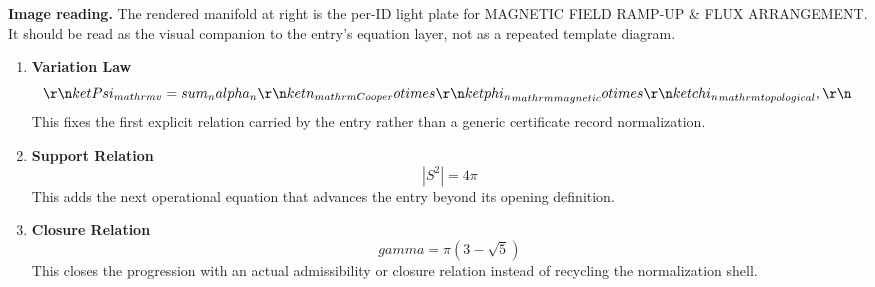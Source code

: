 \begin{samepage}
\noindent\begin{minipage}[t]{0.45\linewidth}
\vspace{0pt}
\raggedright
\scriptsize\textbf{Image reading.} The rendered manifold at right is the per-ID light plate for MAGNETIC FIELD RAMP-UP \& FLUX ARRANGEMENT. It should be read as the visual companion to the entry's equation layer, not as a repeated template diagram.\par
\end{minipage}\hfill
\begin{minipage}[t]{0.53\linewidth}
\vspace*{-0.10in}
\raggedright
{}
\end{minipage}
\end{samepage}

\clearpage


\begin{enumerate}[leftmargin=1.6em,itemsep=9pt,topsep=6pt]
\item \textbf{Variation Law}
\[
\r\n\\ket{\\Psi_{\\mathrm{v}}} = \\sum_{n} \\alpha_n \r\n\\ket{n}_{\\mathrm{Cooper}} \\otimes \r\n\\ket{\\phi_n}_{\\mathrm{magnetic}} \\otimes \r\n\\ket{\\chi_n}_{\\mathrm{topological}},\r\n\
\]
This fixes the first explicit relation carried by the entry rather than a generic certificate record normalization.

\item \textbf{Support Relation}
\[
|S^2|=4\pi
\]
This adds the next operational equation that advances the entry beyond its opening definition.

\item \textbf{Closure Relation}
\[
gamma=\pi(3-\sqrt5)
\]
This closes the progression with an actual admissibility or closure relation instead of recycling the normalization shell.
\end{enumerate}


